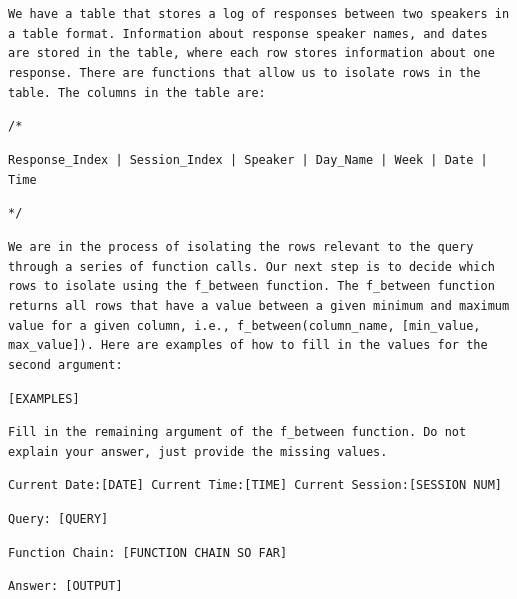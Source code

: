 \documentclass{article}
\begin{document}
\colorbox{prompt_gray}{\begin{minipage}{.98\textwidth}
\texttt{We have a table that stores a log of responses between two speakers in a table format. Information about response speaker names, and dates are stored in the table, where each row stores information about one response. There are functions that allow us to isolate rows in the table. The columns in the table are:}
\newline

\texttt{/*}

\texttt{Response\_Index | Session\_Index | Speaker | Day\_Name | Week | Date | Time}

\texttt{*/}
\newline

\texttt{We are in the process of isolating the rows relevant to the query through a series of function calls. Our next step is to decide which rows to isolate using the f\_between function. The f\_between function returns all rows that have a value between a given minimum and maximum value for a given column, i.e., f\_between(column\_name, [min\_value, max\_value]). Here are examples of how to fill in the values for the second argument:}
\newline

\texttt{[EXAMPLES]}
\newline


\texttt{Fill in the remaining argument of the f\_between function. Do not explain your answer, just provide the missing values.}

\texttt{Current Date:[DATE] Current Time:[TIME] Current Session:[SESSION NUM]}

\texttt{Query: [QUERY]}

\texttt{Function Chain: [FUNCTION CHAIN SO FAR]}

\texttt{Answer: [OUTPUT]}
\end{minipage}}









\newpage
\end{document}
